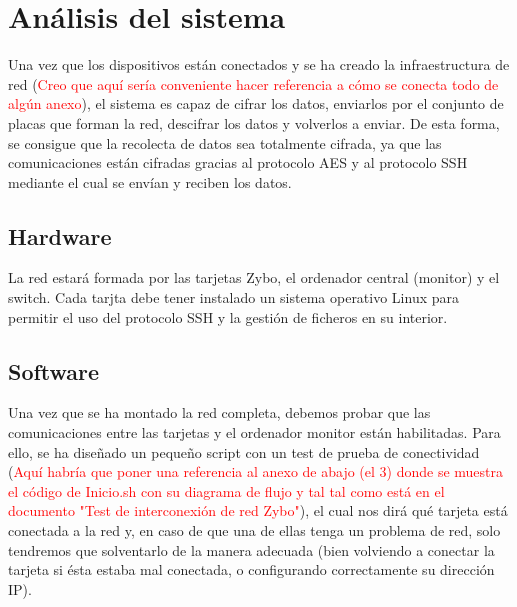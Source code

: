 \section{Análisis del sistema}
Una vez que los dispositivos están conectados y se ha creado la infraestructura de red (\textcolor{red}{Creo que aquí sería conveniente hacer referencia a cómo se conecta todo de algún anexo}), el sistema es capaz de cifrar los datos, enviarlos por el conjunto de placas que forman la red, descifrar los datos y volverlos a enviar. De esta forma, se consigue que la recolecta de datos sea totalmente cifrada, ya que las comunicaciones están cifradas gracias al protocolo AES y al protocolo SSH mediante el cual se envían y reciben los datos.

\subsection{Hardware}
La red estará formada por las tarjetas Zybo, el ordenador central (monitor) y el switch. Cada tarjta debe tener instalado un sistema operativo Linux para permitir el uso del protocolo SSH y la gestión de ficheros en su interior.

\subsection{Software}
Una vez que se ha montado la red completa, debemos probar que las comunicaciones entre las tarjetas y el ordenador monitor están habilitadas. Para ello, se ha diseñado un pequeño script con un test de prueba de conectividad (\textcolor{red}{Aquí habría que poner una referencia al anexo de abajo (el 3) donde se muestra el código de Inicio.sh con su diagrama de flujo y tal tal como está en el documento "Test de interconexión de red Zybo"}), el cual nos dirá qué tarjeta está conectada a la red y, en caso de que una de ellas tenga un problema de red, solo tendremos que solventarlo de la manera adecuada (bien volviendo a conectar la tarjeta si ésta estaba mal conectada, o configurando correctamente su dirección IP).